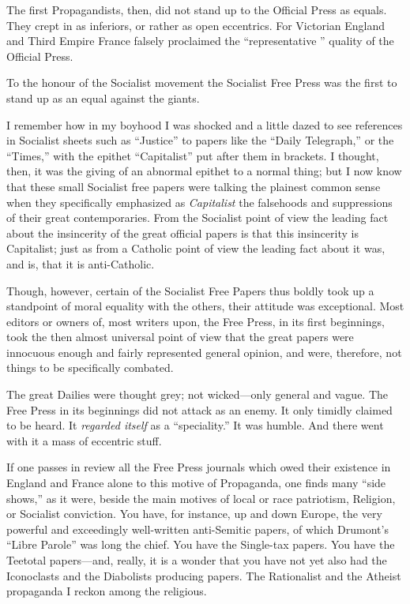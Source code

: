 \documentclass{book}
\begin{document}
The first Propagandists, then, did not stand up to the Official Press as equals. They crept in as inferiors, or rather as open eccentrics. For Victorian England and Third Empire France falsely proclaimed the “representative ” quality of the Official Press.

To the honour of the Socialist movement the Socialist Free Press was the first to stand up as an equal against the giants.

I remember how in my boyhood I was shocked and a little dazed to see references in Socialist sheets such as “Justice” to papers like the “Daily Telegraph,” or the “Times,” with the epithet “Capitalist” put after them in brackets. I thought, then, it was the giving of an abnormal epithet to a normal thing; but I now know that these small Socialist free papers were talking the plainest common sense when they specifically emphasized as \emph{Capitalist} the falsehoods and suppressions of their great contemporaries. From the Socialist point of view the leading fact about the insincerity of the great official papers is that this insincerity is Capitalist; just as from a Catholic point of view the leading fact about it was, and is, that it is anti-Catholic.

Though, however, certain of the Socialist Free Papers thus boldly took up a standpoint of moral equality with the others, their attitude was exceptional. Most editors or owners of, most writers upon, the Free Press, in its first beginnings, took the then almost universal point of view that the great papers were innocuous enough and fairly represented general opinion, and were, therefore, not things to be specifically combated.

The great Dailies were thought grey; not wicked—only general and vague. The Free Press in its beginnings did not attack as an enemy. It only timidly claimed to be heard. It \emph{regarded itself} as a “speciality.” It was humble. And there went with it a mass of eccentric stuff.

If one passes in review all the Free Press journals which owed their existence in England and France alone to this motive of Propaganda, one finds many “side shows,” as it were, beside the main motives of local or race patriotism, Religion, or Socialist conviction. You have, for instance, up and down Europe, the very powerful and exceedingly well-written anti-Semitic papers, of which Drumont’s “Libre Parole” was long the chief. You have the Single-tax papers. You have the Teetotal papers—and, really, it is a wonder that you have not yet also had the Iconoclasts and the Diabolists producing papers. The Rationalist and the Atheist propaganda I reckon among the religious.
\end{document}
